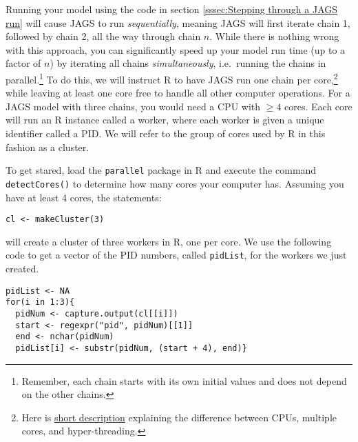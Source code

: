 \documentclass[12pt,english]{article}
\begin{document}
Running your model using the code in section \ref{sssec:Stepping through a JAGS run} will cause JAGS to run \emph{sequentially}, meaning JAGS will first iterate chain 1, followed by chain 2, all the way through chain $n$. While there is nothing wrong with this approach, you can significantly speed up your model run time (up to a factor of $n$) by iterating all chains \emph{simultaneously}, i.e.\ running the chains in parallel.\footnote{Remember, each chain starts with its own initial values and does not depend on the other chains.} To do this, we will instruct R to have JAGS run one chain per core,\footnote{Here is \href{http://www.howtogeek.com/194756/cpu-basics-multiple-cpus-cores-and-hyper-threading-explained/}{short description} explaining the difference between CPUs, multiple cores, and hyper-threading.} while leaving at least one core free to handle all other computer operations. For a JAGS model with three chains, you would need a CPU with $\geq 4$ cores. Each core will run an R instance called a worker, where each worker is given a unique identifier called a PID. We will refer to the group of cores used by R in this fashion as a cluster. 

To get stared, load the \texttt{parallel} package in R and execute the command \texttt{detectCores()} to determine how many cores your computer has. Assuming you have at least 4 cores, the statements:

\begin{Verbatim}
cl <- makeCluster(3)
\end{Verbatim}

\noindent will create a cluster of three workers in R, one per core. We use the following code to get a vector of the PID numbers, called  \texttt{pidList}, for the workers we just created. 

\begin{Verbatim}
pidList <- NA
for(i in 1:3){
  pidNum <- capture.output(cl[[i]])
  start <- regexpr("pid", pidNum)[[1]]
  end <- nchar(pidNum)
  pidList[i] <- substr(pidNum, (start + 4), end)}
\end{Verbatim}
\end{document}

